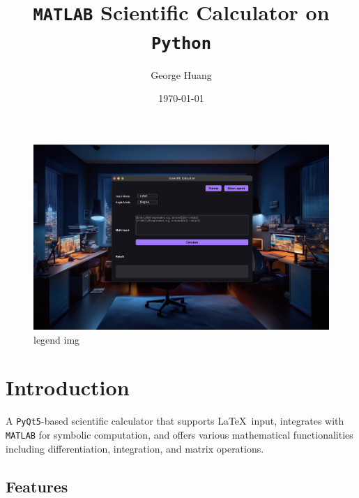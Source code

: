 \documentclass{article}
\begin{document}
\title{\texttt{MATLAB} Scientific Calculator on \texttt{Python}}
\author{George Huang}
\date{\today}
\maketitle

\begin{center}

\end{center}

\begin{figure}[h]
\centering
\includegraphics[width=\linewidth]{imgs/legend_img.png}
\caption{legend img}
\end{figure}

\section{Introduction}

\noindent A \texttt{PyQt5}-based scientific calculator that supports \LaTeX \, input,
integrates with \texttt{MATLAB} for symbolic computation, and offers various
mathematical functionalities including differentiation, integration, and
matrix operations.

\subsection{Features}
\end{document}
